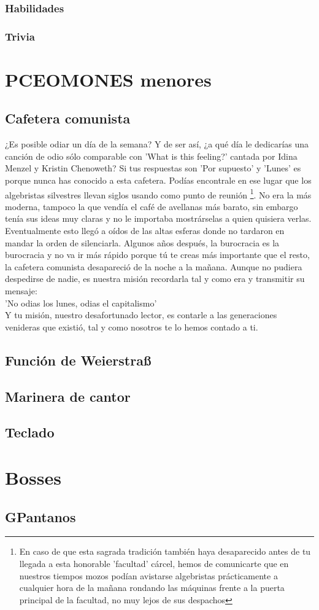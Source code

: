 \documentclass[letterpaper]{article}
\begin{document}
\subsubsection{Habilidades}

\subsubsection{Trivia}
\section{PCEOMONES menores}
\subsection{Cafetera comunista}
¿Es posible odiar un día de la semana? Y de ser así, ¿a qué día le dedicarías una canción de odio sólo comparable con 'What is this feeling?' cantada por Idina
Menzel y Kristin Chenoweth? Si tus respuestas son 'Por supuesto' y 'Lunes' es porque nunca has conocido a esta cafetera. Podías encontrale en ese lugar que los algebristas silvestres llevan siglos usando como punto de reunión \footnote{En caso de que esta sagrada tradición también haya desaparecido antes de tu llegada a esta honorable 'facultad' cárcel, hemos de comunicarte que en nuestros tiempos mozos podían avistarse algebristas prácticamente a cualquier hora de la mañana rondando las máquinas frente a la puerta principal de la facultad, no muy lejos de sus despachos}. No era la más moderna, tampoco la que
vendía el café de avellanas más barato, sin embargo tenía sus ideas muy claras y no le importaba mostrárselas a quien quisiera verlas. Eventualmente esto llegó a
oídos de las altas esferas donde no tardaron en mandar la orden de silenciarla. Algunos años después, la burocracia es la burocracia y no va ir más rápido porque tú
te creas más importante que el resto, la cafetera comunista desapareció de la noche a la mañana. Aunque no pudiera despedirse de nadie, es nuestra misión recordarla tal y como era y transmitir su mensaje:\\
 'No odias los lunes, odias el capitalismo'\\
Y tu misión, nuestro desafortunado lector, es contarle a las generaciones venideras que existió, tal y como nosotros te lo hemos contado a ti.


\subsection{Función de Weierstra{\ss}} %
\subsection{Marinera de cantor}
\subsection{Teclado}

\section{Bosses}
\subsection{GPantanos}
\end{document}
